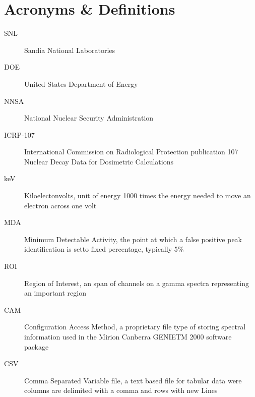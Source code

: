 \documentclass[12pt,report,justified]{SANDreport}
\begin{document}
    \chapter*{Acronyms \& Definitions}
    \begin{description}
	\item[SNL]
	     Sandia National Laboratories
	\item[DOE]
	     United States Department of Energy
	\item[NNSA]
	     National Nuclear Security Administration
          \item[ICRP-107]
	     International Commission on Radiological Protection publication 107 Nuclear Decay Data for Dosimetric Calculations
	\item[keV]
	     Kiloelectonvolts, unit of energy 1000 times the energy needed to move an electron across one volt
	\item[MDA]
	     Minimum Detectable Activity, the point at which a false positive peak identification is setto fixed percentage, typically 5\%
	\item[ROI]
	     Region of Interest, an span of channels on a gamma spectra representing an important region
	\item[CAM] 
	     Configuration Access Method, a proprietary file type of storing spectral information used in the Mirion Canberra GENIETM 2000 software package
	\item[CSV]
	     Comma Separated Variable file, a text based file for tabular data were columns are delimited with a comma and rows with new Lines
    \end{description}


    \SANDmain		%
\end{document}
